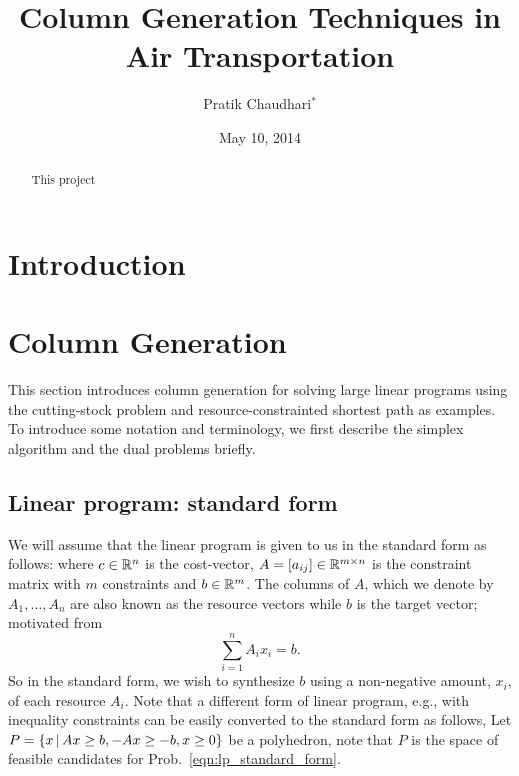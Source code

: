 \documentclass[letterpaper, 10pt, twocolumn, reqno]{amsart}
\title{Column Generation Techniques in Air Transportation}
\author{Pratik Chaudhari$^*$}
\date{May 10, 2014}
\begin{document}
\begin{abstract}
This project
\end{abstract}
\maketitle

\section{Introduction}
\label{sec:intro}

\section{Column Generation}
\label{sec:column_generation}

This section introduces column generation for solving large linear programs using the cutting-stock problem and resource-constrainted shortest path as examples. To introduce some notation and terminology, we first describe the simplex algorithm and the dual problems briefly.

\subsection{Linear program: standard form}
\label{ssec:lp_standard}

We will assume that the linear program is given to us in the standard form as follows:
where $c \in \mathbb{R}^n$ is the cost-vector, $A = [a_{ij}] \in \mathbb{R}^{m \times n}$ is the constraint matrix with $m$ constraints and $b \in \mathbb{R}^m$. The columns of $A$, which we denote by $A_1, \ldots, A_n$ are also known as the resource vectors while $b$ is the target vector; motivated from
$$\sum_{i=1}^n A_i x_i =b.$$
So in the standard form, we wish to synthesize $b$ using a non-negative amount, $x_i$, of each resource $A_i$. Note that a different form of linear program, e.g., with inequality constraints can be easily converted to the standard form as follows,
Let $P = \left\{x \, \vert \, Ax \geq b, -Ax \geq -b, x \geq 0\right\}$ be a polyhedron, note that $P$ is the space of feasible candidates for Prob.~\eqref{eqn:lp_standard_form}.
\end{document}
